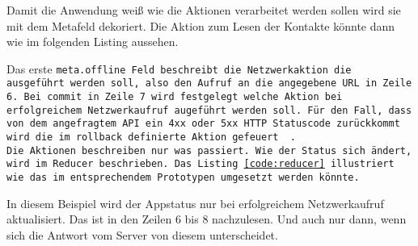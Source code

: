 Damit die Anwendung weiß wie die Aktionen verarbeitet werden sollen wird sie mit dem Metafeld dekoriert. Die Aktion zum Lesen der Kontakte könnte dann wie im folgenden Listing aussehen.
%
\begin{center}
  
\end{center}
%
Das erste \tt{meta.offline} Feld beschreibt die Netzwerkaktion die ausgeführt werden soll, also den Aufruf an die angegebene URL in Zeile 6.
Bei \tt{commit} in Zeile 7 wird festgelegt welche Aktion bei erfolgreichem Netzwerkaufruf augeführt werden soll.
Für den Fall, dass von dem angefragtem \gls{API} ein 4xx oder 5xx \gls{HTTP} Statuscode zurückkommt wird die im \tt{rollback} definierte Aktion gefeuert ~\cite{redux-offline-npm}.\\
Die Aktionen beschreiben nur was passiert. Wie der Status sich ändert, wird im \tt{Reducer} beschrieben.
Das Listing \ref{code:reducer} illustriert wie das im entsprechendem Prototypen umgesetzt werden könnte.
%
\begin{center}
  
\end{center}
%
In diesem Beispiel wird der \gls{App}status nur bei erfolgreichem Netzwerkaufruf aktualisiert. Das ist in den Zeilen 6 bis 8 nachzulesen. Und auch nur dann, wenn sich die Antwort vom Server von diesem unterscheidet.